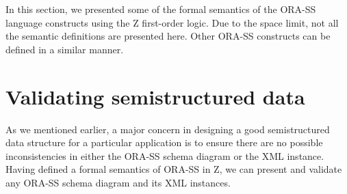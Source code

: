 \documentclass{entcs}
\begin{document}
%
%
In this section, we presented some of the formal semantics of the
ORA-SS language constructs using the Z first-order logic. Due to
the space limit, not all the semantic definitions are presented
here. Other ORA-SS constructs can be defined in a similar manner.

\section{Validating semistructured data}
%
As we mentioned earlier, a major concern in designing a good
semistructured data structure for a particular application is to
ensure there are no possible inconsistencies in either the ORA-SS
schema diagram or the XML instance. Having defined a formal
semantics of ORA-SS in Z, we can present and validate any ORA-SS
schema diagram and its XML instances.
\end{document}
